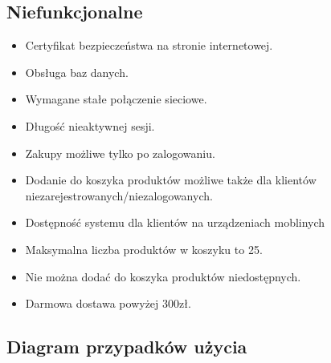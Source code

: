 \documentclass[a4paper,11pt]{article}
\begin{document}
\subsection {Niefunkcjonalne}
\begin{itemize}
	\item Certyfikat bezpieczeństwa na stronie internetowej.
	\item Obsługa baz danych.
	\item Wymagane stałe połączenie sieciowe.
	\item Długość nieaktywnej sesji.
	\item Zakupy możliwe tylko po zalogowaniu.
	\item Dodanie do koszyka produktów możliwe także dla klientów niezarejestrowanych/niezalogowanych.
	\item Dostępność systemu dla klientów na urządzeniach moblinych
	\item Maksymalna liczba produktów w koszyku to 25.
	\item Nie można dodać do koszyka produktów niedostępnych.
	\item Darmowa dostawa powyżej 300zł.
\end{itemize}

\subsection {Diagram przypadków użycia}
\end{document}
